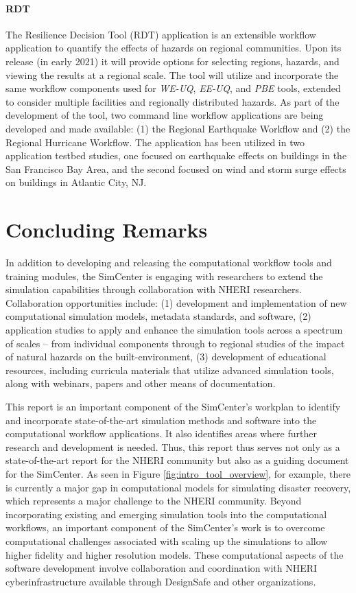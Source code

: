 \paragraph{RDT} The Resilience Decision Tool (RDT) application is an extensible workflow application to quantify the effects of hazards on regional communities. Upon its release (in early 2021) it will provide options for selecting regions, hazards, and viewing the results at a regional scale. The tool will utilize and incorporate the same workflow components used for \emph{WE-UQ}, \emph{EE-UQ}, and \emph{PBE} tools, extended to consider multiple facilities and regionally distributed hazards. As part of the development of the tool, two command line workflow applications are being developed and made available: (1) the Regional Earthquake Workflow and (2) the Regional Hurricane Workflow.  The application has been utilized in two application testbed studies, one focused on earthquake effects on buildings in the San Francisco Bay Area, and the second focused on wind and storm surge effects on buildings in Atlantic City, NJ.

\section{Concluding Remarks}

In addition to developing and releasing the computational workflow tools and training modules, the SimCenter is engaging with researchers to extend the simulation capabilities through collaboration with NHERI researchers. Collaboration opportunities include: (1) development and implementation of new computational simulation models, metadata standards, and software, (2) application studies to apply and enhance the simulation tools across a spectrum of scales – from individual components through to regional studies of the impact of natural hazards on the built-environment, (3) development of educational resources, including curricula materials that utilize advanced simulation tools, along with webinars, papers and other means of documentation. 

This report is an important component of the SimCenter’s workplan to identify and incorporate state-of-the-art simulation methods and software into the computational workflow applications. It also identifies areas where further research and development is needed.  Thus, this report thus serves not only as a state-of-the-art report for the NHERI community but also as a guiding document for the SimCenter.  As seen in Figure \ref{fig:intro_tool_overview}, for example, there is currently a major gap in computational models for simulating disaster recovery, which represents a major challenge to the NHERI community.  Beyond incorporating existing and emerging simulation tools into the computational workflows, an important component of the SimCenter’s work is to overcome computational challenges associated with scaling up the simulations to allow higher fidelity and higher resolution models.  These computational aspects of the software development involve collaboration and coordination with NHERI cyberinfrastructure available through DesignSafe and other organizations. 